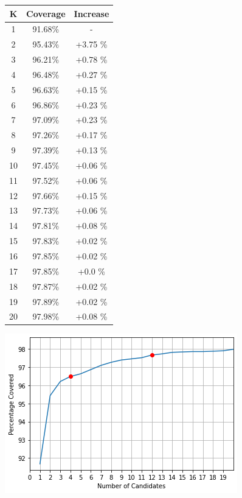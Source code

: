 \documentclass{report}
\theoremstyle{definition}
\theoremstyle{remark}
\begin{document}
\begin{table}

	\begin{minipage}{0.5\linewidth}
	\centering
	\begin{tabular}{c|cc}
    K  & Coverage & Increase \\
    \hline
    1   & 91.68\% & - \\
    2   & 95.43\% & +3.75 \%\\
    3   & 96.21\% & +0.78 \%\\
    4   & 96.48\% & +0.27 \%\\
    5   & 96.63\% & +0.15 \%\\
    6   & 96.86\% & +0.23 \%\\
    7   & 97.09\% & +0.23 \%\\
    8   & 97.26\% & +0.17 \%\\
    9   & 97.39\% & +0.13 \%\\
    10  & 97.45\% & +0.06 \%\\
    11  & 97.52\% & +0.06 \%\\
    12  & 97.66\% & +0.15 \%\\
    13  & 97.73\% & +0.06 \%\\
    14  & 97.81\% & +0.08 \%\\
    15  & 97.83\% & +0.02 \%\\
    16  & 97.85\% & +0.02 \%\\
    17  & 97.85\% & +0.0  \%\\
    18  & 97.87\% & +0.02 \%\\
    19  & 97.89\% & +0.02 \%\\
    20  & 97.98\% & +0.08 \%\\
    \end{tabular}
	\end{minipage}\hfill
	\begin{minipage}{0.5\linewidth}
		\centering
		\includegraphics[scale=0.5]{candplot.png}

\end{minipage}
\end{table}
\end{document}
